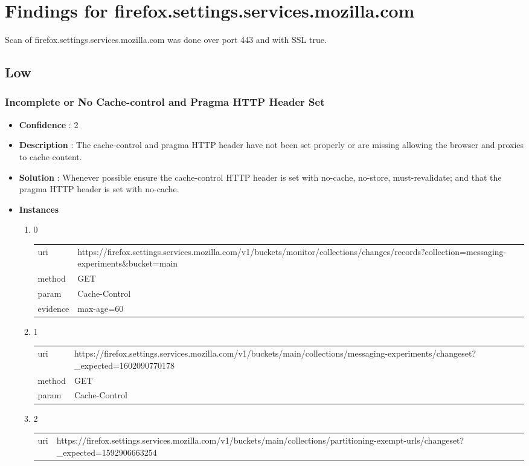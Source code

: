 \documentclass[10pt]{article}
\begin{document}
\section{Findings for firefox.settings.services.mozilla.com}
Scan of firefox.settings.services.mozilla.com was done over port 443 and with SSL true.
\subsection{Low}
\subsubsection{Incomplete or No Cache-control and Pragma HTTP Header Set}
\begin{itemize}
\item[] \textbf{Confidence} : 2
\item[] \textbf{Description} : The cache-control and pragma HTTP header have not been set properly or are missing allowing the browser and proxies to cache content.
\item[] \textbf{Solution} :  Whenever possible ensure the cache-control HTTP header is set with no-cache, no-store, must-revalidate; and that the pragma HTTP header is set with no-cache.
\item[] \textbf{Instances}
\begin{enumerate}
\item[] 0
\begin{tabular}{| l | p{14cm}}
uri & https://firefox.settings.services.mozilla.com/v1/buckets/monitor/collections/changes/records?collection=messaging-experiments\&bucket=main \\
method & GET \\
param & Cache-Control \\
evidence & max-age=60 \\
\end{tabular}
\item[] 1
\begin{tabular}{| l | p{14cm}}
uri & https://firefox.settings.services.mozilla.com/v1/buckets/main/collections/messaging-experiments/changeset?{\_}expected=1602090770178 \\
method & GET \\
param & Cache-Control \\
\end{tabular}
\item[] 2
\begin{tabular}{| l | p{14cm}}
uri & https://firefox.settings.services.mozilla.com/v1/buckets/main/collections/partitioning-exempt-urls/changeset?{\_}expected=1592906663254 \\

\end{tabular}
\end{enumerate}
\end{itemize}
\end{document}
